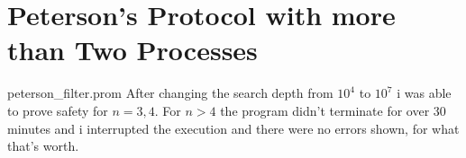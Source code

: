 
\section{Peterson's Protocol with more than Two Processes}
\lstset{language=Promela}
 {peterson_filter.prom}
After changing the search depth from $10^4$ to $10^7$ i was able to prove safety for $n=3,4$. For $n>4$ the program didn't terminate for over 30 minutes and i interrupted the execution and there were no errors shown, for what that's worth.
